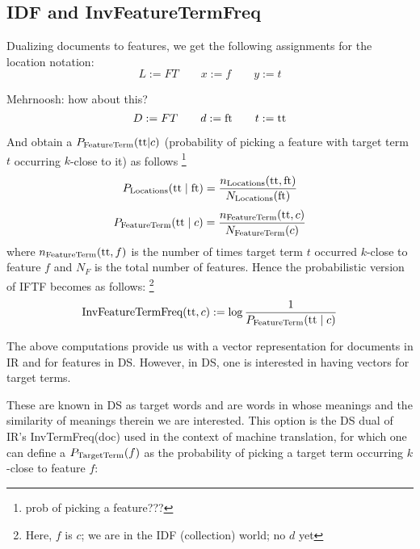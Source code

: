 \hrulefill

\subsection{IDF and InvFeatureTermFreq}

Dualizing documents to features,
we get the following assignments for the location notation:
\[
L := FT \qquad
x := f\qquad
y := t
\]

\newcommand{\featureterm}{\textmd{ft}}
\newcommand{\targetterm}{\textmd{tt}}
\hrulefill Mehrnoosh: how about this?
\[
D := FT \qquad
d := \featureterm\qquad
t := \targetterm
\]

And obtain a $P_{\textmd{FeatureTerm}}(\targetterm|c)$ (probability of picking a feature with target term $t$ occurring $k$-close to it) as follows
\footnote{prob of picking a feature???}
\[
P_{\textmd{Locations}}(\targetterm \mid \featureterm) = \frac{n_{\textmd{Locations}}(\targetterm,\featureterm)}{N_{\textmd{Locations}} (\featureterm)} 
\]
\begin{equation}
P_{\textmd{FeatureTerm}}(\targetterm \mid c) = \frac{n_{\textmd{FeatureTerm}}(\targetterm,c)}{N_{\textmd{FeatureTerm}} (c)} 
\end{equation}
where $n_{\textmd{FeatureTerm}}(\targetterm,f)$ is the number of times target term $t$ occurred $k$-close to feature $f$ and $N_F$ is the total number of features. Hence the probabilistic version of IFTF becomes as follows:
\footnote{Here, $f$ is $c$; we are in the IDF (collection) world; no $d$ yet}
\begin{equation}
\label{eqn:iftf}
\textmd{InvFeatureTermFreq}(\targetterm, c) :=
	\log{\frac{1}{P_{\textmd{FeatureTerm}}(\targetterm \mid c)}}
\end{equation}

\medskip
The above computations provide us with a vector representation for documents in IR and for features in DS. However, in DS, one is interested in having vectors for target terms.

These are known in DS as target words and  are words in whose meanings and the similarity of meanings therein we are interested.
This option is the DS dual of IR's  InvTermFreq(doc) used in the context of machine translation, for which one can define a $P_{\textmd{TargetTerm}}(f) $ as the  probability of picking a target term  occurring $k$-close to feature $f$: 

